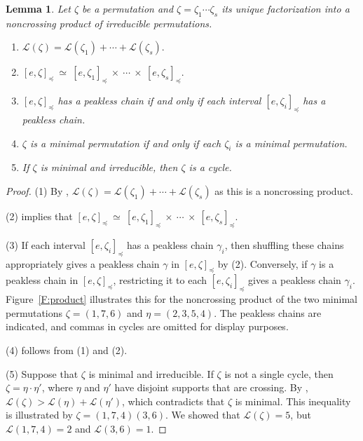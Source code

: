 \documentclass[11pt]{article}
\newtheorem{lemma}[theo]{Lemma}
\theoremstyle{definition}
\numberwithin{equation}{section}
\newcommand{\calL}{{\mathcal L}}
\begin{document}
\begin{lemma}\label{L:properties-noncrossing-products}
    Let $\zeta$ be a permutation and $\zeta=\zeta_1\dotsb \zeta_s$ its unique
    factorization into a noncrossing product of irreducible permutations.
    \begin{enumerate}
        \item
            $\calL(\zeta)= \calL(\zeta_1)+\dotsb+\calL(\zeta_s).$

        \item
            $[e,\zeta]_\preceq\ \simeq\  [e,\zeta_1]_\preceq\ \times\ \dotsb\ \times\  [e,\zeta_s]_\preceq.$

        \item
            $[e,\zeta]_\preceq$ has a peakless chain if and only if each interval $[e,\zeta_i]_\preceq$ has a peakless chain.

        \item
            $\zeta$ is a minimal permutation if and only if each $\zeta_i$ is a minimal permutation.

        \item
            If $\zeta$ is minimal and irreducible, then $\zeta$ is a cycle.
    \end{enumerate}
\end{lemma}

\begin{proof}
    (1) By \cite[Lem.~3.3.1]{BS-Bruhat}, $\calL(\zeta)= \calL(\zeta_1)+\dotsb+\calL(\zeta_s)$ as this is a noncrossing product.

    (2) \cite[Lem.~3.3.3]{BS-Bruhat} implies that $[e,\zeta]_\preceq\ \simeq\  [e,\zeta_1]_\preceq\ \times\ \dotsb\ \times\  [e,\zeta_s]_\preceq$.

    (3) If each interval $[e, \zeta_i]_{\preceq}$ has a peakless chain
        $\gamma_i$, then shuffling these chains appropriately gives a peakless
        chain $\gamma$ in $[e,\zeta]_\preceq$ by (2). Conversely, if $\gamma$ is
        a peakless chain in  $[e,\zeta]_\preceq$, restricting it to each
        $[e,\zeta_i]_\preceq$ gives a peakless chain $\gamma_i$.
        Figure~\ref{F:product} illustrates this
        for the noncrossing product
        of the two minimal permutations $\zeta=(1,7,6)$ and $\eta=(2,3,5,4)$. The
        peakless chains are indicated, and commas in cycles are omitted for display
        purposes.

    (4) follows from (1) and (2).

    (5) Suppose that $\zeta$ is minimal and irreducible.
        If $\zeta$ is not a single cycle, then $\zeta=\eta\cdot \eta'$,
        where $\eta$ and $\eta'$ have disjoint supports that are crossing.
        By \cite[Lem.~3.3.1]{BS-Bruhat}, $\calL(\zeta)> \calL(\eta) + \calL(\eta')$, which contradicts that $\zeta$ is minimal.
        This inequality is illustrated by $\zeta=(1,7,4)(3,6)$.
        We showed that $\calL(\zeta)=5$, but $\calL(1,7,4) = 2$ and $\calL(3,6)=1$.
\end{proof}
\end{document}

